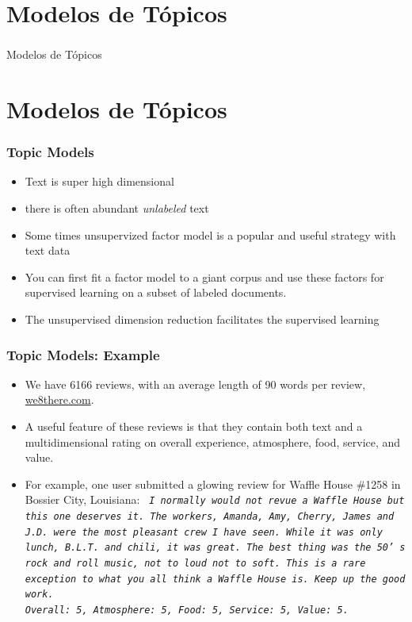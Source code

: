 \documentclass[
  shownotes,
  xcolor={svgnames},
  hyperref={colorlinks,citecolor=DarkBlue,linkcolor=DarkRed,urlcolor=DarkBlue}
  , aspectratio=169]{beamer}
\begin{document}
\section{Modelos de Tópicos}
\begin{frame}[fragile]
\frametitle{}


\centering
{\huge \textcolor{andesred}{Modelos de Tópicos}}


\end{frame}
\section{Modelos de Tópicos}
\begin{frame}
\frametitle{Topic Models}

\begin{itemize}
\item Text is super high dimensional
\medskip
\item there is often abundant {\it unlabeled} text
\medskip
\item Some times unsupervized factor model is a popular and useful strategy with text data
\medskip
\item You can first fit a factor model to a giant corpus and use these factors for supervised learning on a subset of labeled documents.
\medskip
\item The unsupervised dimension reduction facilitates the supervised learning
\end{itemize}
\end{frame}
\begin{frame}
\frametitle{Topic Models: Example}

\begin{itemize}


\item We have 6166 reviews, with an average length of 90 words per review, \url{we8there.com}. 
\medskip
\item A useful feature of these reviews is that they contain both text and a multidimensional rating on overall experience, atmosphere, food, service, and value. 
\medskip
\item For example, one user submitted a glowing review for Waffle House \#1258 in Bossier City, Louisiana: 
\medskip
{\tt \it 
I normally would not revue a Waffle House but this one deserves it. The workers, Amanda, Amy, Cherry, James and J.D. were the most pleasant crew I have seen. While it was only lunch, B.L.T. and chili, it was great. The best thing was the 50’ s rock and roll music, not to loud not to soft. This is a rare exception to what you all think a Waffle House is. Keep up the good work. \\
Overall: 5, Atmosphere: 5, Food: 5, Service: 5, Value: 5. 
}
\end{itemize}
\end{frame}
\end{document}
